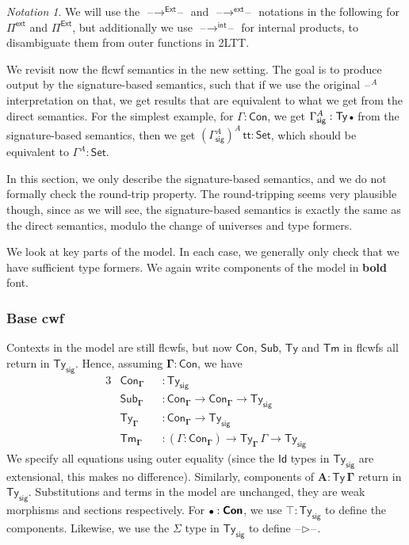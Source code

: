 \documentclass[12pt,a4paper,twoside,openany]{book}
\theoremstyle{remark}
\newtheorem{notation}{Notation}
\theoremstyle{definition}
\theoremstyle{theorem}
\newcommand{\ms}[1]{\mathsf{#1}}
\newcommand{\bs}[1]{\boldsymbol{#1}}
\newcommand{\toind}{\to^{\ms{int}}}
\newcommand{\Tys}{\ms{Ty_{sig}}}
\newcommand{\Con}{\mathsf{Con}}
\newcommand{\Sub}{\mathsf{Sub}}
\newcommand{\Tm}{\mathsf{Tm}}
\newcommand{\Ty}{\mathsf{Ty}}
\newcommand{\Id}{\mathsf{Id}}
\renewcommand{\tt}{\mathsf{tt}}
\newcommand{\blank}{\mathord{\hspace{1pt}\text{--}\hspace{1pt}}}
\newcommand{\Set}{\mathsf{Set}}
\newcommand{\ext}{\triangleright}
\newcommand{\emptycon}{\scaleobj{.75}\bullet}
\newcommand{\Pie}{\Pi^{\mathsf{Ext}}}
\newcommand{\toe}{\to^{\ms{Ext}}}
\newcommand{\Piinf}{\Pi^{\mathsf{ext}}}
\newcommand{\toinf}{\to^{\ms{ext}}}
\newcommand{\bCon}{\bs{\Con}}
\newcommand{\bTy}{\bs{\Ty}}
\newcommand{\bGamma}{\bs{\Gamma}}
\newcommand{\bA}{\bs{A}}
\newcommand{\bemptycon}{\scaleobj{.75}{\bs{\bullet}}}
\begin{document}
\begin{notation}
We will use the $\blank\!\toe\!\blank$ and $\blank\!\toinf\!\blank$ notations in
the following for $\Piinf$ and $\Pie$, but additionally we use
$\blank\!\toind\!\blank$ for internal products, to disambiguate them from outer
functions in 2LTT.
\end{notation}

We revisit now the flcwf semantics in the new setting. The goal is to produce
output by the signature-based semantics, such that if we use the original
$\blank^A$ interpretation on that, we get results that are equivalent to what we
get from the direct semantics. For the simplest example, for $\Gamma : \Con$, we
get $\Gamma^A_{\ms{sig}} : \Ty\,\emptycon$ from the signature-based semantics,
then we get $(\Gamma^A_{\ms{sig}})^A\,\tt : \Set$, which should be equivalent to
$\Gamma^A : \Set$.

In this section, we only describe the signature-based semantics, and we do not
formally check the round-trip property. The round-tripping seems very plausible
though, since as we will see, the signature-based semantics is exactly the same
as the direct semantics, modulo the change of universes and type formers.

We look at key parts of the model. In each case, we generally only check that we
have sufficient type formers. We again write components of the model in
\textbf{bold} font.

\subsubsection{Base cwf}
Contexts in the model are still flcwfs, but now $\Con$, $\Sub$, $\Ty$ and $\Tm$ in
flcwfs all return in $\Tys$. Hence, assuming $\bGamma : \bCon$, we have
\begin{alignat*}{3}
  &\Con_{\bGamma} &&: \Tys \\
  &\Sub_{\bGamma} &&: \Con_{\bGamma} \to \Con_{\bGamma} \to \Tys \\
  &\Ty_{\bGamma}  &&: \Con_{\bGamma} \to \Tys \\
  &\Tm_{\bGamma}  &&: (\Gamma : \Con_{\bGamma}) \to \Ty_{\bGamma}\,\Gamma \to \Tys
\end{alignat*}
We specify all equations using outer equality (since the $\Id$ types in $\Tys$
are extensional, this makes no difference). Similarly, components of $\bA :
\bTy\,\bGamma$ return in $\Tys$. Substitutions and terms in the model are
unchanged, they are weak morphisms and sections respectively. For $\bemptycon :
\bCon$, we use $\top : \Tys$ to define the components. Likewise, we use
the $\Sigma$ type in $\Tys$ to define $\blank\bs{\ext}\blank$.
\end{document}
